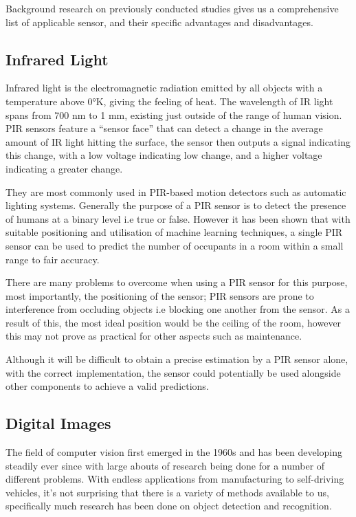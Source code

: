 \documentclass{l4proj}
\begin{document}
Background research on previously conducted studies gives us a comprehensive list of applicable sensor, and their specific advantages and disadvantages.

\subsection{Infrared Light}
Infrared light is the electromagnetic radiation emitted by all objects with a temperature above 0°K, giving the feeling of heat. The wavelength of IR light spans from 700 nm to 1 mm, existing just outside of the range of human vision\cite{c-inred}. PIR sensors feature a “sensor face” that can detect a change in the average amount of IR light hitting the surface, the sensor then outputs a signal indicating this change, with a low voltage indicating low change, and a higher voltage indicating a greater change\cite{c-pir}.

They are most commonly used in PIR-based motion detectors such as automatic lighting systems. Generally the purpose of a PIR sensor is to detect the presence of humans at a binary level i.e true or false. However it has been shown that with suitable positioning and utilisation of machine learning techniques, a single PIR sensor can be used to predict the number of occupants in a room within a small range to fair accuracy\cite{c-pir-study}.

There are many problems to overcome when using a PIR sensor for this purpose, most importantly, the positioning of the sensor; PIR sensors are prone to interference from occluding objects i.e blocking one another from the sensor. As a result of this, the most ideal position would be the ceiling of the room, however this may not prove as practical for other aspects such as maintenance\cite{c-pir-study}.

Although it will be difficult to obtain a precise estimation by a PIR sensor alone, with the correct implementation, the sensor could potentially be used alongside other components to achieve a valid predictions.

\subsection{Digital Images}
The field of computer vision first emerged in the 1960s and has been developing steadily ever since with large abouts of research being done for a number of different problems. With endless applications from manufacturing to self-driving vehicles, it’s not surprising that there is a variety of methods available to us, specifically much research has been done on object detection and recognition. 
\end{document}
